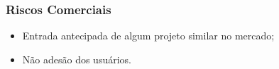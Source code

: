 \subsubsection{Riscos Comerciais}
\begin{itemize}
  \item Entrada antecipada de algum projeto similar no mercado;
  \item Não adesão dos usuários.
\end{itemize}

%	



